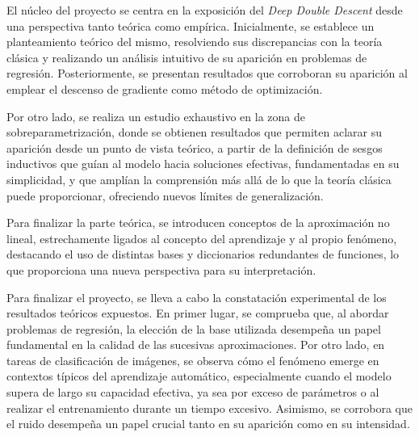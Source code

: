 El núcleo del proyecto se centra en la exposición del \textit{Deep Double Descent} desde una perspectiva tanto teórica como empírica. Inicialmente, se establece un planteamiento teórico del mismo, resolviendo sus discrepancias con la teoría clásica y realizando un análisis intuitivo de su aparición en problemas de regresión. Posteriormente, se presentan resultados que corroboran su aparición al emplear el descenso de gradiente como método de optimización. 

Por otro lado, se realiza un estudio exhaustivo en la zona de sobreparametrización, donde se obtienen resultados que permiten aclarar su aparición desde un punto de vista teórico, a partir de la definición de sesgos inductivos que guían al modelo hacia soluciones efectivas, fundamentadas en su simplicidad, y que amplían la comprensión más allá de lo que la teoría clásica puede proporcionar, ofreciendo nuevos límites de generalización.

Para finalizar la parte teórica, se introducen conceptos de la aproximación no lineal, estrechamente ligados al concepto del aprendizaje y al propio fenómeno, destacando el uso de distintas bases y diccionarios redundantes de funciones, lo que proporciona una nueva perspectiva para su interpretación.

Para finalizar el proyecto, se lleva a cabo la constatación experimental de los resultados teóricos expuestos. En primer lugar, se comprueba que, al abordar problemas de regresión, la elección de la base utilizada desempeña un papel fundamental en la calidad de las sucesivas aproximaciones. Por otro lado, en tareas de clasificación de imágenes, se observa cómo el fenómeno emerge en contextos típicos del aprendizaje automático, especialmente cuando el modelo supera de largo su capacidad efectiva, ya sea por exceso de parámetros o al realizar el entrenamiento durante un tiempo excesivo. Asimismo, se corrobora que el ruido desempeña un papel crucial tanto en su aparición como en su intensidad.

